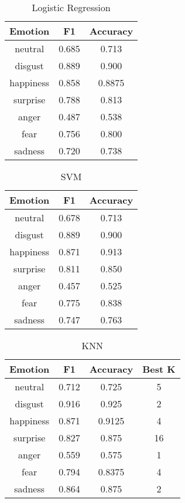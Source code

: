 \begin{table}[h]
\caption{Logistic Regression}
\label{table:logistic}
\centering
\begin{tabular}{|c|c|c|}
\hline
\textbf{Emotion} &  \textbf{F1} &  \textbf{Accuracy} \\ \hline \hline
neutral & 0.685 & 0.713 \\ \hline
disgust & 0.889 & 0.900 \\ \hline
happiness & 0.858 & 0.8875 \\ \hline
surprise & 0.788 & 0.813 \\ \hline
anger & 0.487 & 0.538 \\ \hline
fear & 0.756 & 0.800 \\ \hline
sadness & 0.720 & 0.738 \\ \hline
\end{tabular}
\end{table}
\begin{table}[h]
\caption{SVM}
\label{table:svm}
\centering
\begin{tabular}{|c|c|c|}
\hline
\textbf{Emotion} &  \textbf{F1} &  \textbf{Accuracy} \\ \hline \hline
neutral& 0.678 & 0.713  \\ \hline
disgust& 0.889 & 0.900 \\ \hline
happiness& 0.871 & 0.913 \\ \hline
surprise& 0.811& 0.850 \\ \hline
anger& 0.457& 0.525 \\ \hline
fear& 0.775 & 0.838 \\ \hline
sadness& 0.747 & 0.763 \\ \hline
\end{tabular}
\end{table}
\begin{table}[h]
\caption{KNN}
\label{table:knn}
\centering
    \begin{tabular}{|c|c|c|c|}
\hline
\textbf{Emotion} &  \textbf{F1} &  \textbf{Accuracy} & \textbf{Best K}\\ \hline \hline
neutral& 0.712& 0.725& 5 \\ \hline
disgust& 0.916& 0.925& 2 \\ \hline
happiness& 0.871& 0.9125& 4 \\ \hline
surprise& 0.827& 0.875& 16 \\ \hline
anger& 0.559& 0.575& 1 \\ \hline
fear& 0.794& 0.8375& 4 \\ \hline
sadness& 0.864& 0.875& 2 \\ \hline
\end{tabular}
\end{table}
